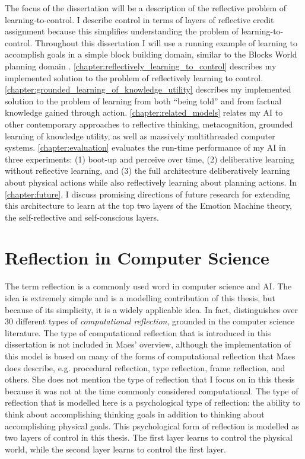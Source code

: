The focus of the dissertation will be a description of the reflective
problem of learning-to-control.  I describe control in terms of layers
of reflective credit assignment because this simplifies understanding
the problem of learning-to-control.  Throughout this dissertation I
will use a running example of learning to accomplish goals in a simple
block building domain, similar to the Blocks World planning domain
{\cite[]{winograd:1970}}.
{\mbox{\autoref{chapter:reflectively_learning_to_control}}} describes
my implemented solution to the problem of reflectively learning to
control.
{\mbox{\autoref{chapter:grounded_learning_of_knowledge_utility}}}
describes my implemented solution to the problem of learning from both
``being told'' and from factual knowledge gained through action.
{\mbox{\autoref{chapter:related_models}}} relates my AI to other
contemporary approaches to reflective thinking, metacognition,
grounded learning of knowledge utility, as well as massively
multithreaded computer systems.  {\mbox{\autoref{chapter:evaluation}}}
evaluates the run-time performance of my AI in three experiments: (1)
boot-up and perceive over time, (2) deliberative learning without
reflective learning, and (3) the full architecture deliberatively
learning about physical actions while also reflectively learning about
planning actions.  In {\mbox{\autoref{chapter:future}}}, I discuss
promising directions of future research for extending this
architecture to learn at the top two layers of the Emotion Machine
theory, the self-reflective and self-conscious layers.

\section{Reflection in Computer Science}

The term reflection is a commonly used word in computer science and
AI.  The idea is extremely simple and is a modelling contribution of
this thesis, but because of its simplicity, it is a widely applicable
idea.  In fact, \cite{maes:1988} distinguishes over 30 different types
of \emph{computational reflection}, grounded in the computer science
literature.  The type of computational reflection that is introduced
in this dissertation is not included in Maes' overview, although the
implementation of this model is based on many of the forms of
computational reflection that Maes does describe, e.g. procedural
reflection, type reflection, frame reflection, and others.  She does
not mention the type of reflection that I focus on in this thesis
because it was not at the time commonly considered computational.  The
type of reflection that is modelled here is a psychological type of
reflection: the ability to think about accomplishing thinking goals in
addition to thinking about accomplishing physical goals.  This
psychological form of reflection is modelled as two layers of control
in this thesis.  The first layer learns to control the physical world,
while the second layer learns to control the first layer.

